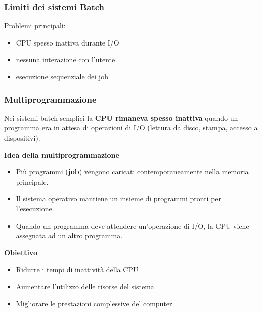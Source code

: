 \documentclass{beamer}
\begin{document}
	
	\begin{frame}
		\frametitle{Limiti dei sistemi Batch}
		
		Problemi principali:
		
		\begin{itemize}
			\item CPU spesso inattiva durante I/O
			\item nessuna interazione con l'utente
			\item esecuzione sequenziale dei job
		\end{itemize}
		
	\end{frame}
	

	
\begin{frame}
	\frametitle{Multiprogrammazione}
	
	Nei sistemi batch semplici la \textbf{CPU rimaneva spesso inattiva}
	quando un programma era in attesa di operazioni di I/O
	(lettura da disco, stampa, accesso a dispositivi).
	
	
	\textbf{Idea della multiprogrammazione}
	
	\begin{itemize}
		
		\item Più programmi (\textbf{job}) vengono caricati
		contemporaneamente nella memoria principale.
		
		\item Il sistema operativo mantiene un insieme di programmi
		pronti per l'esecuzione.
		
		\item Quando un programma deve attendere un'operazione di I/O,
		la CPU viene assegnata ad un altro programma.
		
	\end{itemize}
	
	
	\textbf{Obiettivo}
	
	\begin{itemize}
		
		\item Ridurre i tempi di inattività della CPU
		\item Aumentare l'utilizzo delle risorse del sistema
		\item Migliorare le prestazioni complessive del computer
		
	\end{itemize}
	
\end{frame}
	 
\end{document}
